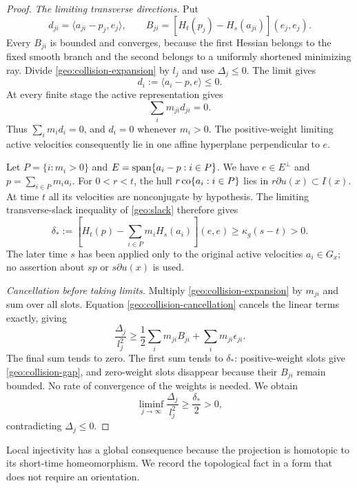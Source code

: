 \begin{proof}
\smallskip\noindent
\emph{The limiting transverse directions.}
Put
\[
 d_{ji}=\langle a_{ji}-p_j,e_j\rangle,\qquad
 B_{ji}=[H_t(p_j)-H_s(a_{ji})](e_j,e_j).
\]
Every $B_{ji}$ is bounded and converges, because the first Hessian
belongs to the fixed smooth branch and the second belongs to a
uniformly shortened minimizing ray. Divide
\eqref{geo:collision-expansion} by $l_j$ and use $\Delta_j\leq0$.
The limit gives
\[
 d_i:=\langle a_i-p,e\rangle\leq0.
\]
At every finite stage the active representation gives
\begin{equation}
 \sum_i m_{ji}d_{ji}=0.
 \label{geo:collision-cancellation}
\end{equation}
Thus $\sum_i m_i d_i=0$, and $d_i=0$ whenever $m_i>0$.
The positive-weight limiting active velocities consequently lie in
one affine hyperplane perpendicular to $e$.

Let $P=\{i:m_i>0\}$ and
$E=\operatorname{span}\{a_i-p:i\in P\}$. We have $e\in E^\perp$ and
$p=\sum_{i\in P}m_i a_i$. For $0<r<t$, the hull
$r\operatorname{co}\{a_i:i\in P\}$ lies in $r\partial u(x)\subset I(x)$.
At time $t$ all its velocities are nonconjugate by hypothesis.
The limiting transverse-slack inequality of \cref{geo:slack} therefore gives
\begin{equation}
 \delta_*:=
 [H_t(p)-\sum_{i\in P}m_iH_s(a_i)](e,e)
 \geq\kappa_g(s-t)>0.
 \label{geo:collision-gap}
\end{equation}
The later time $s$ has been applied only to the original active
velocities $a_i\in G_x$; no assertion about $sp$ or
$s\partial u(x)$ is used.

\smallskip\noindent
\emph{Cancellation before taking limits.}
Multiply \eqref{geo:collision-expansion} by $m_{ji}$ and sum over
all slots. Equation \eqref{geo:collision-cancellation} cancels the
linear terms exactly, giving
\[
 \frac{\Delta_j}{l_j^2}
 \geq\frac12\sum_i m_{ji}B_{ji}
       +\sum_i m_{ji}\epsilon_{ji}.
\]
The final sum tends to zero. The first sum tends to $\delta_*$:
positive-weight slots give \eqref{geo:collision-gap}, and zero-weight
slots disappear because their $B_{ji}$ remain bounded. No rate of
convergence of the weights is needed. We obtain
\[
 \liminf_{j\to\infty}\frac{\Delta_j}{l_j^2}
 \geq\frac{\delta_*}{2}>0,
\]
contradicting $\Delta_j\leq0$.
\end{proof}

Local injectivity has a global consequence because the projection is
homotopic to its short-time homeomorphism. We record the topological
fact in a form that does not require an orientation.

